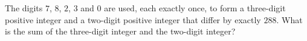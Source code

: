 The digits $7$, $8$, $2$, $3$ and $0$ are used, each exactly once, to form a three-digit positive integer and a two-digit positive integer that differ by exactly $288$. What is the sum of the three-digit integer and the two-digit integer?
